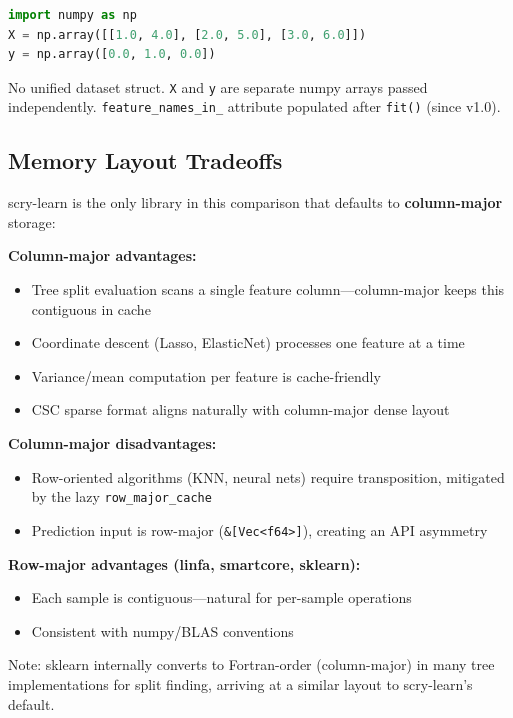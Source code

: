 \documentclass[11pt,a4paper]{article}
\begin{document}
\begin{lstlisting}[language=Python]
import numpy as np
X = np.array([[1.0, 4.0], [2.0, 5.0], [3.0, 6.0]])
y = np.array([0.0, 1.0, 0.0])
\end{lstlisting}

No unified dataset struct. \texttt{X} and \texttt{y} are separate numpy arrays passed independently. \texttt{feature\_names\_in\_} attribute populated after \texttt{fit()} (since v1.0).

\subsection{Memory Layout Tradeoffs}

scry-learn is the only library in this comparison that defaults to \textbf{column-major} storage:

\textbf{Column-major advantages:}
\begin{itemize}[itemsep=2pt]
\item Tree split evaluation scans a single feature column---column-major keeps this contiguous in cache
\item Coordinate descent (Lasso, ElasticNet) processes one feature at a time
\item Variance/mean computation per feature is cache-friendly
\item CSC sparse format aligns naturally with column-major dense layout
\end{itemize}

\textbf{Column-major disadvantages:}
\begin{itemize}[itemsep=2pt]
\item Row-oriented algorithms (KNN, neural nets) require transposition, mitigated by the lazy \texttt{row\_major\_cache}
\item Prediction input is row-major (\texttt{\&[Vec<f64>]}), creating an API asymmetry
\end{itemize}

\textbf{Row-major advantages (linfa, smartcore, sklearn):}
\begin{itemize}[itemsep=2pt]
\item Each sample is contiguous---natural for per-sample operations
\item Consistent with numpy/BLAS conventions
\end{itemize}

Note: sklearn internally converts to Fortran-order (column-major) in many tree implementations for split finding, arriving at a similar layout to scry-learn's default.
\end{document}
